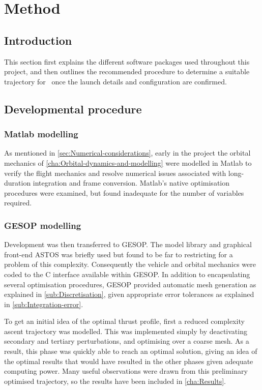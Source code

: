 \chapter{Method} \label{cha:Method}

\section{Introduction} \label{sec:Method-intro}

This section first explains the different software packages used throughout this project, and then outlines the recommended procedure to determine a suitable trajectory for \BW\ once the launch details and configuration are confirmed.

\section{Developmental procedure} \label{sec:Development}

\subsection{Matlab modelling} \label{sub:Matlab}

As mentioned in \autoref{sec:Numerical-considerations}, early in the project the orbital mechanics of \autoref{cha:Orbital-dynamics-and-modelling} were modelled in Matlab to verify the flight mechanics and resolve numerical issues associated with long-duration integration and frame conversion. Matlab's native optimisation procedures were examined, but found inadequate for the number of variables required.

\subsection{GESOP modelling} \label{sub:GESOP}

Development was then transferred to GESOP. The model library and graphical front-end ASTOS was briefly used but found to be far to restricting for a problem of this complexity. Consequently the vehicle and orbital mechanics were coded to the C interface available within GESOP. In addition to encapsulating several optimisation procedures, GESOP provided automatic mesh generation as explained in \autoref{sub:Discretisation}, given appropriate error tolerances as explained in \autoref{sub:Integration-error}.

To get an initial idea of the optimal thrust profile, first a reduced complexity ascent trajectory was modelled. This was implemented simply by deactivating secondary and tertiary perturbations, and optimising over a coarse mesh. As a result, this phase was quickly able to reach an optimal solution, giving an idea of the optimal results that would have resulted in the other phases given adequate computing power. Many useful observations were drawn from this preliminary optimised trajectory, so the results have been included in \autoref{cha:Results}.

